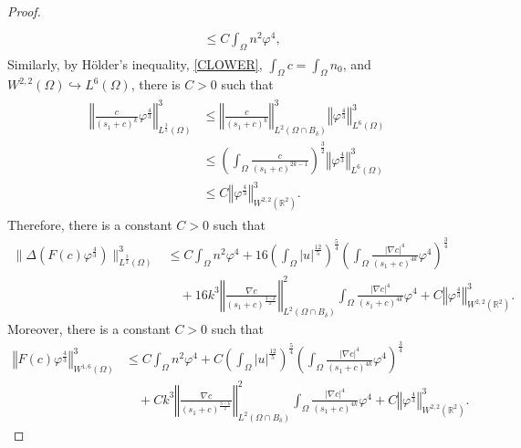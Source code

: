\documentclass[10pt,a4paper]{amsart}
\newcommand{\R}{{ \mathbb{R}  }}
\newcommand{\bke}[1]{\left( #1 \right)}
\newcommand{\norm}[1]{\left\Vert #1 \right\Vert}
\begin{document}
\begin{proof}
\begin{align*}
\begin{aligned}
\\&\le  C\int_{\Omega}n^{2}\varphi^{4},
\end{aligned}
\end{align*}
Similarly, by H\"older's inequality, \eqref{CLOWER}, $\int_{\Omega}c=\int_{\Omega}n_{0}$, and $W^{2,2}(\Omega)\hookrightarrow L^{6}(\Omega)$,
there is $C>0$ such that %
\begin{align*}
\begin{aligned}
\norm{ \frac{ c }{(s_{1}+c)^{k}}  \varphi^{\frac{4}{3}}   }_{L^{\frac{3}{2}}(\Omega)}^{3} 
&\le \norm{ \frac{ c }{(s_{1}+c)^{k}}}_{L^{2}(\Omega \cap B_{\delta} )}^{3} \norm{  \varphi^{\frac{4}{3}}   }_{L^{6}(\Omega)}^{3} 
\\&  \le \left(\int_{\Omega} \frac{c}{(s_1 + c)^{2k-1}}\right)^{\frac{3}{2}} \norm{  \varphi^{\frac{4}{3}}   }_{L^{6}(\Omega)}^{3} 
\\&\le C \norm{\varphi^{\frac{4}{3}}}_{W^{2,2}(\R^{2})}^{3} .
\end{aligned}
\end{align*}
Therefore, there is a constant $C>0$ such that 
\[\begin{aligned}
\| \Delta(F(c)   \varphi^{\frac{4}{3}})  \|_{L^{\frac{3}{2}}(\Omega)}^{3}
&\leq C\int_{\Omega}n^{2}\varphi^{4} 
+ 16 \bke{\int_{\Omega}|u|^{\frac{12}{5}} }^{\frac{5}{4}}\bke{\int_{\Omega} \frac{|\nabla c|^{4}}{(s_{1}+c)^{4k}}\varphi^{4}}^{\frac{3}{4}} \\
&\quad + 16 k^3 \norm{\frac{\nabla c}{(s_{1}+c)^{\frac{3-k}{2}}}}_{L^{2}(\Omega\cap B_{\delta})}^{2}  \int_{\Omega} \frac{|\nabla c|^{4}}{(s_{1}+c)^{4k}}\varphi^{4}
 + C \norm{\varphi^{\frac{4}{3}}}_{W^{2,2}(\R^{2})}^{3}.
\end{aligned}\]
Moreover, there is a constant $C>0$ such that 
\[\begin{aligned}
\norm{   F(c)  \varphi^{\frac{4}{3}}}_{W^{1,6}(\Omega)}^{3}
&\leq C\int_{\Omega}n^{2}\varphi^{4} 
+ C\bke{\int_{\Omega}|u|^{\frac{12}{5}} }^{\frac{5}{4}}\bke{\int_{\Omega} \frac{|\nabla c|^{4}}{(s_{1}+c)^{4k}}\varphi^{4}}^{\frac{3}{4}} \\
&\quad + C k^3 \norm{\frac{\nabla c}{(s_{1}+c)^{\frac{3-k}{2}}}}_{L^{2}(\Omega\cap B_{\delta})}^{2}  \int_{\Omega} \frac{|\nabla c|^{4}}{(s_{1}+c)^{4k}}\varphi^{4}
 + C \norm{\varphi^{\frac{4}{3}}}_{W^{2,2}(\R^{2})}^{3}.
\end{aligned}\]


\end{proof}
\end{document}
